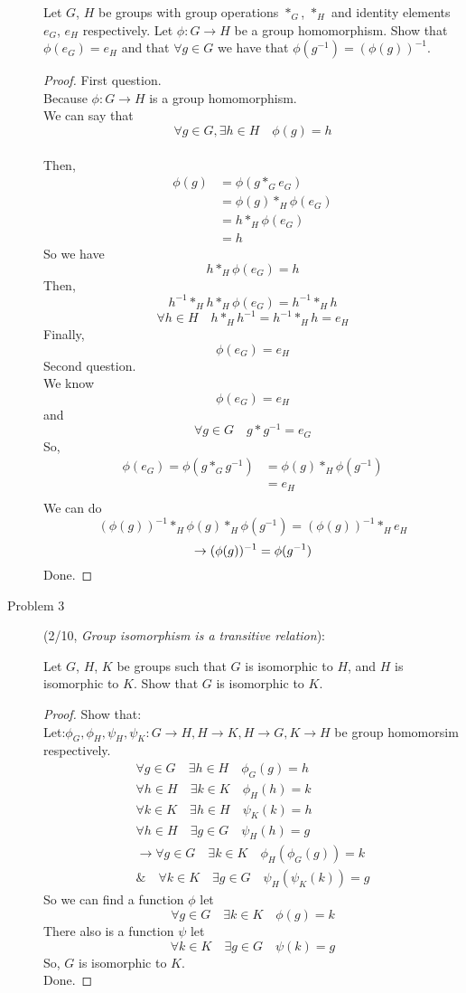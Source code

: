 \documentclass[a4paper]{article}
\begin{document}
\begin{description}
Let $G$, $H$ be groups with group operations $*_G$, $*_H$ and identity
elements $e_G$, $e_H$ respectively. Let $\phi:G\to H$ be a group
homomorphism. Show that $\phi(e_G)=e_H$ and that $\forall g\in G$ we
have that $\phi(g^{-1})=(\phi(g))^{-1}$.
\begin{proof}
  First question.\\Because $\phi:G\to H$ is a group homomorphism.\\
  We can say that $$\forall g \in G,\exists h \in H \quad \phi(g)=h$$\\
  Then,
  \begin{align*}
    \phi(g)&=\phi(g*_G e_G)\\
    &=\phi(g)*_H \phi(e_G)\\
    &=h*_H \phi(e_G)\\
    &=h
  \end{align*}
  So we have $$h*_H\phi(e_G)=h$$
  Then,$$h^{-1}*_Hh*_H \phi(e_G)=h^{-1}*_H h$$
  $$\forall h \in H \quad h*_Hh^{-1}=h^{-1}*_Hh=e_H$$
  Finally,$$\phi(e_G)=e_H$$
  Second question.\\
  We know $$\phi(e_G)=e_H $$
   and $$\forall g \in G \quad g*g^{-1}=e_G $$
  So,
  \begin{align*}
    \phi(e_G)=\phi(g*_G g^{-1})&=\phi(g)*_H \phi(g^{-1}) \\
    &=e_H\\
  \end{align*}
  We can do $$(\phi(g))^{-1}*_H\phi(g)*_H\phi(g^{-1})=(\phi(g))^{-1}*_He_H$$
    $$\to (\phi(g))^{-1}=\phi(g^{-1})\\$$
  Done.
\end{proof}
\item[Problem 3](2/10, \textit{Group isomorphism is a transitive relation}):

Let $G$, $H$, $K$ be groups such that $G$ is isomorphic to $H$, and
$H$ is isomorphic to $K$. Show that $G$ is isomorphic to $K$.
\begin{proof}
 Show that:\\
 Let:$\phi_G,\phi_H,\psi_H,\psi_K:G\to H,H\to K , H\to G, K\to H$ \quad be group homomorsim respectively.
 \begin{align*}
   \forall g \in G \quad \exists h \in H \quad\phi_G(g)=h\\
   \forall h \in H \quad \exists k \in K \quad\phi_H(h)=k\\
   \forall k \in K \quad \exists h \in H \quad\psi_K(k)=h\\
   \forall h \in H \quad \exists g \in G \quad\psi_H(h)=g\\
   \to \forall g \in G \quad \exists k \in K \quad \phi_H(\phi_G(g))=k\\
   \&\quad \forall k \in K \quad \exists g \in G \quad \psi_H(\psi_K(k))=g
 \end{align*}
 So we can find a function $\phi$ let $$\forall g \in G \quad \exists k \in K \quad \phi(g)=k$$
 There also is a function $\psi$ let $$\forall k \in K \quad \exists g \in G \quad \psi(k)=g$$
 So, $G$ is isomorphic to $K$.\\
 Done.
\end{proof}

\end{description}
\end{document}
